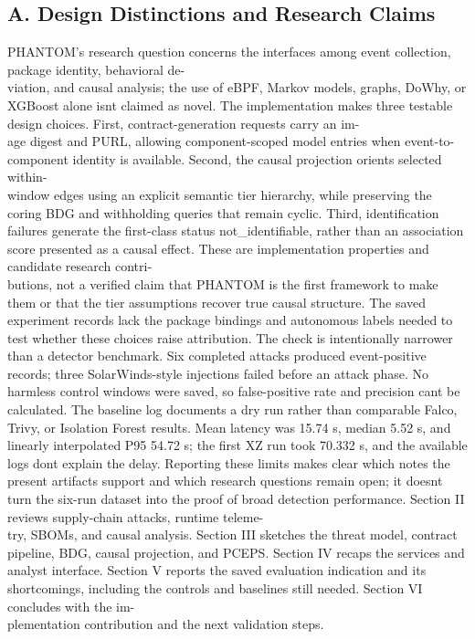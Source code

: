 \documentclass[conference]{IEEEtran}
\begin{document}
\subsection*{A. Design Distinctions and Research Claims}
PHANTOM's research question concerns the interfaces among event collection, package identity, behavioral de-\\viation, and causal analysis; the use of eBPF, Markov models, graphs, DoWhy, or XGBoost alone isn\textquotesingle t claimed as novel. The implementation makes three testable design choices. First, contract-generation requests carry an im-\\age digest and PURL, allowing component-scoped model entries when event-to-component identity is available. Second, the causal projection orients selected within-\\window edges using an explicit semantic tier hierarchy, while preserving the coring BDG and withholding queries that remain cyclic. Third, identification failures generate the first-class status not\_identifiable, rather than an association score presented as a causal effect. These are implementation properties and candidate research contri-\\butions, not a verified claim that PHANTOM is the first framework to make them or that the tier assumptions recover true causal structure. The saved experiment records lack the package bindings and autonomous labels needed to test whether these choices raise attribution. The check is intentionally narrower than a detector benchmark. Six completed attacks produced event-positive records; three SolarWinds-style injections failed before an attack phase. No harmless control windows were saved, so false-positive rate and precision can\textquotesingle t be calculated. The baseline log documents a dry run rather than comparable Falco, Trivy, or Isolation Forest results. Mean latency was 15.74 s, median 5.52 s, and linearly interpolated P95 54.72 s; the first XZ run took 70.332 s, and the available logs don\textquotesingle t explain the delay. Reporting these limits makes clear which notes the present artifacts support and which research questions remain open; it doesn\textquotesingle t turn the six-run dataset into the proof of broad detection performance. Section II reviews supply-chain attacks, runtime teleme-\\try, SBOMs, and causal analysis. Section III sketches the threat model, contract pipeline, BDG, causal projection, and PCEPS. Section IV recaps the services and analyst interface. Section V reports the saved evaluation indication and its shortcomings, including the controls and baselines still needed. Section VI concludes with the im-\\plementation contribution and the next validation steps.
\end{document}
